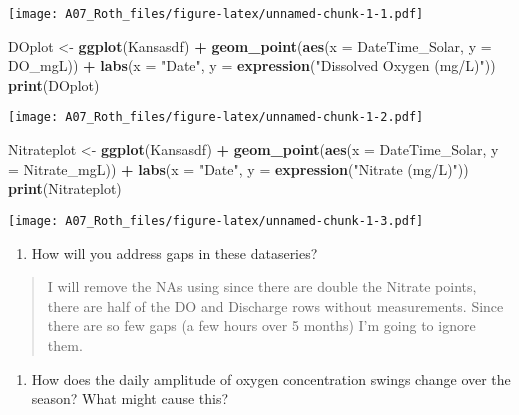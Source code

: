 \documentclass[]{article}
\newenvironment{Shaded}{\begin{snugshade}}{\end{snugshade}}
\newcommand{\DataTypeTok}[1]{\textcolor[rgb]{0.13,0.29,0.53}{#1}}
\newcommand{\KeywordTok}[1]{\textcolor[rgb]{0.13,0.29,0.53}{\textbf{#1}}}
\newcommand{\NormalTok}[1]{#1}
\newcommand{\OperatorTok}[1]{\textcolor[rgb]{0.81,0.36,0.00}{\textbf{#1}}}
\newcommand{\StringTok}[1]{\textcolor[rgb]{0.31,0.60,0.02}{#1}}
\providecommand{\tightlist}{%
  \setlength{\itemsep}{0pt}\setlength{\parskip}{0pt}}
\begin{document}
\texttt{[image: A07\_Roth\_files/figure-latex/unnamed-chunk-1-1.pdf]}

\begin{Shaded}
\begin{Highlighting}[]
\NormalTok{DOplot <-}\StringTok{ }\KeywordTok{ggplot}\NormalTok{(Kansasdf) }\OperatorTok{+}
\StringTok{  }\KeywordTok{geom_point}\NormalTok{(}\KeywordTok{aes}\NormalTok{(}\DataTypeTok{x =}\NormalTok{ DateTime_Solar, }\DataTypeTok{y =}\NormalTok{ DO_mgL)) }\OperatorTok{+}
\StringTok{  }\KeywordTok{labs}\NormalTok{(}\DataTypeTok{x =} \StringTok{"Date"}\NormalTok{, }\DataTypeTok{y =} \KeywordTok{expression}\NormalTok{(}\StringTok{"Dissolved Oxygen (mg/L)"}\NormalTok{))}
\KeywordTok{print}\NormalTok{(DOplot)}
\end{Highlighting}
\end{Shaded}

\texttt{[image: A07\_Roth\_files/figure-latex/unnamed-chunk-1-2.pdf]}

\begin{Shaded}
\begin{Highlighting}[]
\NormalTok{Nitrateplot <-}\StringTok{ }\KeywordTok{ggplot}\NormalTok{(Kansasdf) }\OperatorTok{+}
\StringTok{  }\KeywordTok{geom_point}\NormalTok{(}\KeywordTok{aes}\NormalTok{(}\DataTypeTok{x =}\NormalTok{ DateTime_Solar, }\DataTypeTok{y =}\NormalTok{ Nitrate_mgL)) }\OperatorTok{+}
\StringTok{  }\KeywordTok{labs}\NormalTok{(}\DataTypeTok{x =} \StringTok{"Date"}\NormalTok{, }\DataTypeTok{y =} \KeywordTok{expression}\NormalTok{(}\StringTok{"Nitrate (mg/L)"}\NormalTok{))}
\KeywordTok{print}\NormalTok{(Nitrateplot)}
\end{Highlighting}
\end{Shaded}

\texttt{[image: A07\_Roth\_files/figure-latex/unnamed-chunk-1-3.pdf]}

\begin{enumerate}
\def\labelenumi{\arabic{enumi}.}
\setcounter{enumi}{6}
\tightlist
\item
  How will you address gaps in these dataseries?
\end{enumerate}

\begin{quote}
I will remove the NAs using since there are double the Nitrate points,
there are half of the DO and Discharge rows without measurements. Since
there are so few gaps (a few hours over 5 months) I'm going to ignore
them.
\end{quote}

\begin{enumerate}
\def\labelenumi{\arabic{enumi}.}
\setcounter{enumi}{7}
\tightlist
\item
  How does the daily amplitude of oxygen concentration swings change
  over the season? What might cause this?
\end{enumerate}
\end{document}
